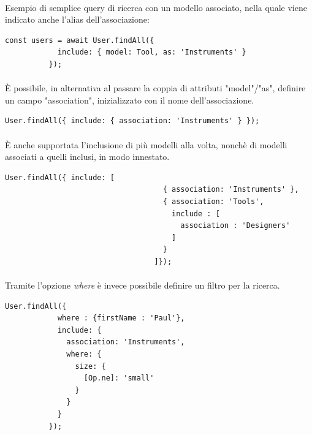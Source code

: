 \documentclass[a4paper, 12pt]{report}
\begin{document}
        \paragraph*{}
        Esempio di semplice query di ricerca con un modello associato, nella quale viene indicato anche l'alias dell'associazione:
        \begin{Verbatim}[samepage=true]
          const users = await User.findAll({
            include: { model: Tool, as: 'Instruments' }
          });
        \end{Verbatim}
        \paragraph*{}
        È possibile, in alternativa al passare la coppia di attributi "model"/"as", definire un campo "association", inizializzato con il nome dell'associazione.
        \begin{Verbatim}[samepage=true]
          User.findAll({ include: { association: 'Instruments' } });
        \end{Verbatim}
        \paragraph*{}
        È anche supportata l'inclusione di più modelli alla volta, nonchè di modelli associati a quelli inclusi, in modo innestato.
        \begin{Verbatim}[samepage=true]
          User.findAll({ include: [
                                    { association: 'Instruments' }, 
                                    { association: 'Tools', 
                                      include : [
                                        association : 'Designers'
                                      ]
                                    }
                                  ]});
        \end{Verbatim}
        \paragraph*{}
        Tramite l'opzione \emph{where} è invece possibile definire un filtro per la ricerca.
        \begin{Verbatim}[samepage=true]
          User.findAll({
            where : {firstName : 'Paul'},
            include: {
              association: 'Instruments',
              where: {
                size: {
                  [Op.ne]: 'small'
                }
              }
            }
          });
        \end{Verbatim}
\end{document}
